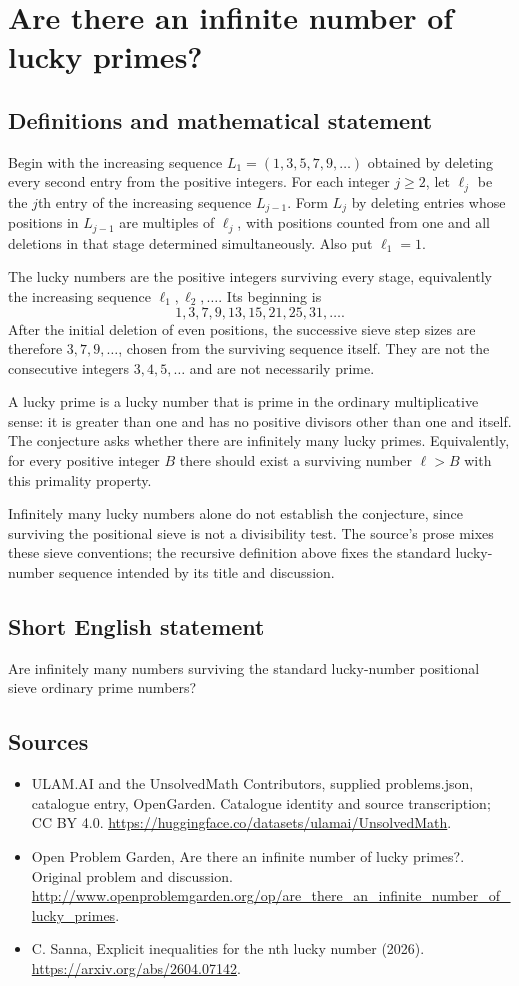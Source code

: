 \documentclass[11pt,a4paper]{article}
\begin{document}
\section*{Are there an infinite number of lucky primes?}\label{statement}

\subsection{Definitions and mathematical statement}
Begin with the increasing sequence $L_1=(1,3,5,7,9,\ldots)$ obtained by deleting every second entry from the positive integers. For each integer $j\ge2$, let $\ell_j$ be the $j$th entry of the increasing sequence $L_{j-1}$. Form $L_j$ by deleting entries whose positions in $L_{j-1}$ are multiples of $\ell_j$, with positions counted from one and all deletions in that stage determined simultaneously. Also put $\ell_1=1$.

The lucky numbers are the positive integers surviving every stage, equivalently the increasing sequence $\ell_1,\ell_2,\ldots$. Its beginning is
\[
                         1,3,7,9,13,15,21,25,31,\ldots.
\]
After the initial deletion of even positions, the successive sieve step sizes are therefore $3,7,9,\ldots$, chosen from the surviving sequence itself. They are not the consecutive integers $3,4,5,\ldots$ and are not necessarily prime.

A lucky prime is a lucky number that is prime in the ordinary multiplicative sense: it is greater than one and has no positive divisors other than one and itself. The conjecture asks whether there are infinitely many lucky primes. Equivalently, for every positive integer $B$ there should exist a surviving number $\ell>B$ with this primality property.

Infinitely many lucky numbers alone do not establish the conjecture, since surviving the positional sieve is not a divisibility test. The source's prose mixes these sieve conventions; the recursive definition above fixes the standard lucky-number sequence intended by its title and discussion.
\subsection{Short English statement}
Are infinitely many numbers surviving the standard lucky-number positional sieve ordinary prime numbers?
\subsection{Sources}
\begin{itemize}
\item[S1] ULAM.AI and the UnsolvedMath Contributors, supplied problems.json, catalogue entry, OpenGarden. Catalogue identity and source transcription; CC BY 4.0.
\url{https://huggingface.co/datasets/ulamai/UnsolvedMath}.
\item[S2] Open Problem Garden, Are there an infinite number of lucky primes?. Original problem and discussion.
\url{http://www.openproblemgarden.org/op/are_there_an_infinite_number_of_lucky_primes}.
\item[S3] C. Sanna, Explicit inequalities for the nth lucky number (2026).
\url{https://arxiv.org/abs/2604.07142}.
\end{itemize}
\end{document}
